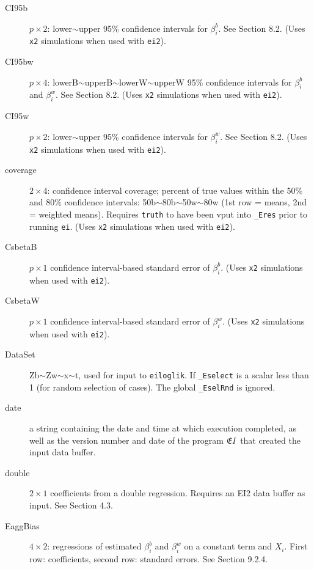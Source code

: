 \documentclass[11pt,titlepage]{article}
\newcommand{\EI}{\ensuremath{{\mathfrak EI}}}
\begin{document}
\begin{description}
\item[CI95b] $p\times 2$: lower$\sim$upper 95\% confidence intervals
  for $\beta_i^b$.  See Section 8.2.  (Uses \texttt{x2}
  simulations when used with \texttt{ei2}).

\item[CI95bw] $p\times 4$: lowerB$\sim$upperB$\sim$lowerW$\sim$upperW
  95\% confidence intervals for $\beta_i^b$ and $\beta_i^w$.  See
  Section 8.2.  (Uses \texttt{x2} simulations when used
  with \texttt{ei2}).

\item[CI95w] $p\times 2$: lower$\sim$upper 95\% confidence intervals
  for $\beta_i^w$.  See Section 8.2.  (Uses \texttt{x2}
  simulations when used with \texttt{ei2}).

\item[coverage] $2\times 4$: confidence interval coverage; percent of
  true values within the 50\% and 80\% confidence intervals:
  50b$\sim$80b$\sim$50w$\sim$80w (1st row = means, 2nd = weighted
  means).  Requires \texttt{truth} to have been vput into
  \texttt{\_Eres} prior to running \texttt{ei}.  (Uses \texttt{x2}
  simulations when used with \texttt{ei2}).

\item[CsbetaB] $p\times 1$ confidence interval-based standard error of
  $\beta_i^b$.  (Uses \texttt{x2} simulations when used with
  \texttt{ei2}).

\item[CsbetaW] $p\times 1$ confidence interval-based standard error of
  $\beta_i^w$.  (Uses \texttt{x2} simulations when used with
  \texttt{ei2}).

\item[DataSet] Zb$\sim$Zw$\sim$x$\sim$t, used for input to
  \texttt{eiloglik}.  If \texttt{\_Eselect} is a scalar less than 1
  (for random selection of cases).  The global \texttt{\_EselRnd} is
  ignored.

\item[date] a string containing the date and time at which execution
  completed, as well as the version number and date of the program
  \EI\ that created the input data buffer.

\item[double] $2\times 1$ coefficients from a double regression.
  Requires an EI2 data buffer as input.  See Section 4.3.

\item[EaggBias] $4\times 2$: regressions of estimated $\beta_i^b$ and
  $\beta_i^w$ on a constant term and $X_i$.  First row: coefficients,
  second row: standard errors.  See Section 9.2.4.


\end{description}
\end{document}

